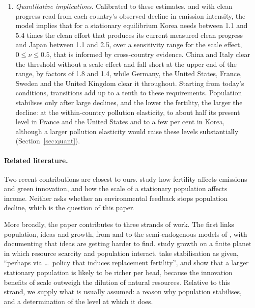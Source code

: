 \documentclass[11pt]{article}
\begin{document}
\begin{enumerate}
surveys and a panel of 161 countries, and, under the maintained conversion from settlement size to
habitat, the implied feedback strength, $\hat S\approx0.21$, lies well inside the stable region. Stated
ideal fertility rises with habitat at a little over half the rate of realised fertility, pointing to a
role for preferences alongside costs. At a given density and income, fertility is higher where the
pollution load is lower, while stated ideals show no detectable response to pollution, suggesting that
pollution acts mainly through costs. The evidence is associational: it documents the correlations the mechanism
predicts, not causal effects (Section~\ref{sec:empirics}).
\item \emph{Quantitative implications.} Calibrated to these estimates, and with clean progress read from
each country's observed decline in emission intensity, the model implies that for a stationary
equilibrium Korea needs between 1.1 and 5.4 times the clean effort that produces its current measured
clean progress and Japan between 1.1 and 2.5, over a sensitivity range for the scale effect,
$0\le\nu\le0.5$, that is informed by cross-country evidence. China and Italy clear the threshold
without a scale effect and fall short at the upper end of the range, by factors of 1.8 and 1.4, while
Germany, the United States, France, Sweden and the United Kingdom clear it throughout. Starting from
today's conditions, transitions add up to a tenth to these requirements. Population stabilises only
after large declines, and the lower the fertility, the larger the decline: at the within-country
pollution elasticity, to about half its present level in France and the United States and to a few per
cent in Korea, although a larger pollution elasticity would raise these levels substantially
(Section~\ref{sec:quant}).
\end{enumerate}

\paragraph{Related literature.}
Two recent contributions are closest to ours. \citet{beulmann2025} study how fertility affects
emissions and green innovation, and \citet{edenkuruc2026} how the scale of a stationary population
affects income. Neither asks whether an environmental feedback stops population decline, which is the
question of this paper.

More broadly, the paper contributes to three strands of work. The first links population, ideas and growth, from
\citet{romer1990} and \citet{kremer1993} to the semi-endogenous models of \citet{jones1995}, with
\citet{bloom2020} documenting that ideas are getting harder to find. \citet{peretto2015} study growth on
a finite planet in which resource scarcity and population interact. \citet{edenkuruc2026} take
stabilisation as given, ``perhaps via \ldots\ policy that induces replacement fertility'', and show that a
larger stationary population is likely to be richer per head, because the innovation benefits of scale
outweigh the dilution of natural resources. Relative to this strand, we supply what is usually assumed: a
reason why population stabilises, and a determination of the level at which it does.
\end{document}
